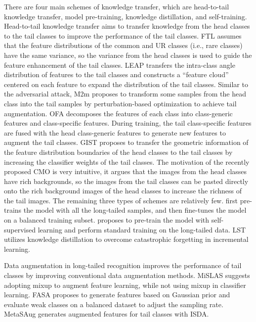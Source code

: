 \documentclass[10pt,twocolumn,letterpaper]{article}
\begin{document}
There are four main schemes of knowledge transfer, which are head-to-tail knowledge transfer, model pre-training, knowledge distillation, and self-training. Head-to-tail knowledge transfer aims to transfer knowledge from the head classes to the tail classes to improve the performance of the tail classes. FTL \cite{paper38} assumes that the feature distributions of the common and UR classes (i.e., rare classes) have the same variance, so the variance from the head classes is used to guide the feature enhancement of the tail classes. LEAP \cite{paper39} transfers the intra-class angle distribution of features to the tail classes and constructs a ``feature cloud'' centered on each feature to expand the distribution of the tail classes. Similar to the adversarial attack, M2m \cite{paper42} proposes to transform some samples from the head class into the tail samples by perturbation-based optimization to achieve tail augmentation. OFA \cite{paper10} decomposes the features of each class into class-generic features and class-specific features. During training, the tail class-specific features are fused with the head class-generic features to generate new features to augment the tail classes. GIST \cite{paper41} proposes to transfer the geometric information of the feature distribution boundaries of the head classes to the tail classes by increasing the classifier weights of the tail classes. The motivation of the recently proposed CMO \cite{paper8} is very intuitive, it argues that the images from the head classes have rich backgrounds, so the images from the tail classes can be pasted directly onto the rich background images of the head classes to increase the richness of the tail images. The remaining three types of schemes are relatively few. \cite{paper72} first pre-trains the model with all the long-tailed samples, and then fine-tunes the model on a balanced training subset. \cite{paper73} proposes to pre-train the model with self-supervised learning and perform standard training on the long-tailed data. LST \cite{paper74} utilizes knowledge distillation to overcome catastrophic forgetting in incremental learning.

Data augmentation in long-tailed recognition improves the performance of tail classes by improving conventional data augmentation methods. MiSLAS \cite{paper1} suggests adopting mixup to augment feature learning, while not using mixup in classifier learning. FASA \cite{paper71} proposes to generate features based on Gaussian prior and evaluate weak classes on a balanced dataset to adjust the sampling rate. MetaSAug \cite{paper43} generates augmented features for tail classes with ISDA.
\end{document}

